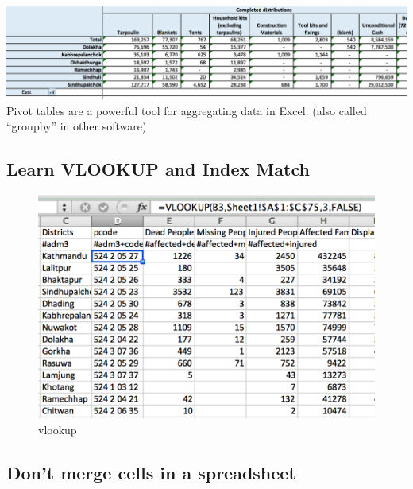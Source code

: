 \documentclass[
  a4paper,
  onecolumn,
  oneside]{book}
\begin{document}
\includegraphics{part1/./images/pivot.png} Pivot tables are a powerful
tool for aggregating data in Excel. (also called ``groupby'' in other
software)

\hypertarget{learn-vlookup-and-index-match}{%
\subsection{Learn VLOOKUP and Index
Match}\label{learn-vlookup-and-index-match}}

\begin{figure}

{\centering \includegraphics{part1/./images/vlookup.png}

}

\caption{vlookup}

\end{figure}

\hypertarget{dont-merge-cells-in-a-spreadsheet}{%
\subsection{Don't merge cells in a
spreadsheet}\label{dont-merge-cells-in-a-spreadsheet}}
\end{document}
